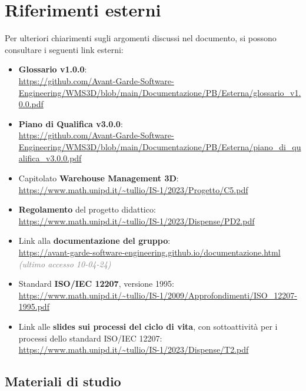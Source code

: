 \section{Riferimenti esterni}\label{sec:riferimenti_esterni}
Per ulteriori chiarimenti sugli argomenti discussi nel documento, si possono consultare i seguenti link esterni:
\begin{itemize}
    \item \textbf{Glossario v1.0.0}:\\
    \url{https://github.com/Avant-Garde-Software-Engineering/WMS3D/blob/main/Documentazione/PB/Esterna/glossario_v1.0.0.pdf}
    \item \textbf{Piano di Qualifica v3.0.0}:\\
    \url{https://github.com/Avant-Garde-Software-Engineering/WMS3D/blob/main/Documentazione/PB/Esterna/piano_di_qualifica_v3.0.0.pdf}
    \item Capitolato \textbf{Warehouse Management 3D}:\\
    \url{https://www.math.unipd.it/~tullio/IS-1/2023/Progetto/C5.pdf} 
    \item \textbf{Regolamento} del progetto didattico:\\
    \url{https://www.math.unipd.it/~tullio/IS-1/2023/Dispense/PD2.pdf} 
    \item Link alla \textbf{documentazione del gruppo}:\\
    \url{https://avant-garde-software-engineering.github.io/documentazione.html} \textcolor{gray}{\textit{(ultimo accesso 10-04-24)}}
    \item Standard \textbf{ISO/IEC 12207}, versione 1995:\\
    \url{https://www.math.unipd.it/~tullio/IS-1/2009/Approfondimenti/ISO_12207-1995.pdf} 
    \item Link alle \textbf{slides sui processi del ciclo di vita}, con sottoattività per i processi dello standard ISO/IEC 12207:\\
    \url{https://www.math.unipd.it/~tullio/IS-1/2023/Dispense/T2.pdf} 
\end{itemize}
\subsection{Materiali di studio}\label{sec:riferimenti_esterni:materiali_di_studio}
